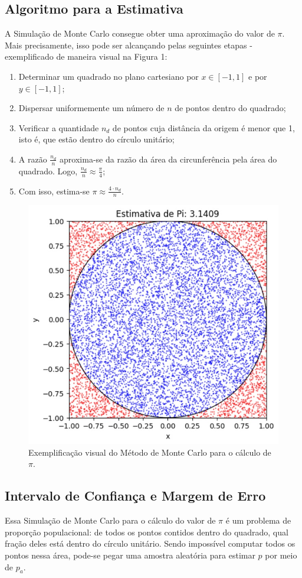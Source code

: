 \documentclass{article}
\begin{document}
\subsection{Algoritmo para a Estimativa}
A Simulação de Monte Carlo consegue obter uma aproximação do valor de $\pi$. Mais precisamente, isso pode ser alcançando pelas seguintes etapas - exemplificado de maneira visual na Figura 1:

\begin{enumerate}
    \item Determinar um quadrado no plano cartesiano por $x\in[-1, 1]$ e por $y\in[-1, 1]$;
    \item Dispersar uniformemente um número de $n$ de pontos dentro do quadrado;
    \item Verificar a quantidade $n_d$ de pontos cuja distância da origem é menor que 1, isto é, que estão dentro do círculo unitário;
    \item A razão $\frac{n_d}{n}$ aproxima-se da razão da área da circunferência pela área do quadrado. Logo, $\frac{n_d}{n} \approx \frac{\pi}{4}$;
    \item Com isso, estima-se $\pi \approx \frac{4 \cdot n_d}{n}$.
\end{enumerate}

\begin{figure}[h]
\centering
\includegraphics[width=0.50\linewidth]{Figura 1.jpg}
\caption{\label{fig:Figura 1}Exemplificação visual do Método de Monte Carlo para o cálculo de $\pi$.}
\end{figure}

\subsection{Intervalo de Confiança  e Margem de Erro}

Essa Simulação de Monte Carlo para o cálculo do valor de $\pi$ é um problema de proporção populacional: de todos os pontos contidos dentro do quadrado, qual fração deles está dentro do círculo unitário. Sendo impossível computar todos os pontos nessa área, pode-se pegar uma amostra aleatória para estimar $p$ por meio de $p_a$.
\end{document}
